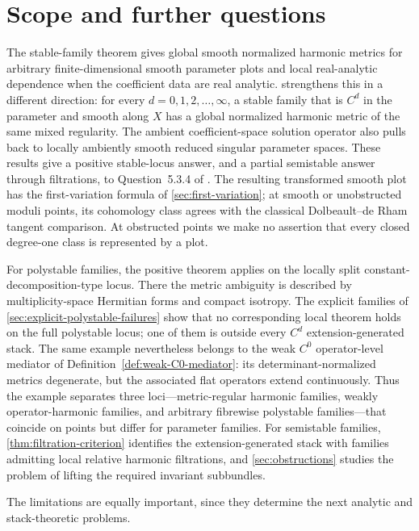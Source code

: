 \documentclass[11pt,reqno]{amsart}
\theoremstyle{definition}
\theoremstyle{remark}
\begin{document}
\section{Scope and further questions}\label{sec:further}

The stable-family theorem gives global smooth normalized harmonic metrics for arbitrary finite-dimensional smooth parameter plots and local real-analytic dependence when the coefficient data are real analytic.   strengthens this in a different direction: for every $d=0,1,2,\ldots,\infty$, a stable family that is $C^d$ in the parameter and smooth along $X$ has a global normalized harmonic metric of the same mixed regularity.  The ambient coefficient-space solution operator also pulls back to locally ambiently smooth reduced singular parameter spaces.  These results give a positive stable-locus answer, and a partial semistable answer through filtrations, to Question~5.3.4 of \cite{AzamRayan2026}.  The resulting transformed smooth plot has the first-variation formula of \cref{sec:first-variation}; at smooth or unobstructed moduli points, its cohomology class agrees with the classical Dolbeault--de Rham tangent comparison.  At obstructed points we make no assertion that every closed degree-one class is represented by a plot.

For polystable families, the positive theorem applies on the locally split constant-decomposition-type locus.  There the metric ambiguity is described by multiplicity-space Hermitian forms and compact isotropy.  The explicit families of \cref{sec:explicit-polystable-failures} show that no corresponding local theorem holds on the full polystable locus; one of them is outside every $C^d$ extension-generated stack.  The same example nevertheless belongs to the weak $C^0$ operator-level mediator of Definition~\ref{def:weak-C0-mediator}: its determinant-normalized metrics degenerate, but the associated flat operators extend continuously.  Thus the example separates three loci---metric-regular harmonic families, weakly operator-harmonic families, and arbitrary fibrewise polystable families---that coincide on points but differ for parameter families.  For semistable families, \cref{thm:filtration-criterion} identifies the extension-generated stack with families admitting local relative harmonic filtrations, and \cref{sec:obstructions} studies the problem of lifting the required invariant subbundles.


The limitations are equally important, since they determine the next analytic and stack-theoretic problems.
\end{document}
